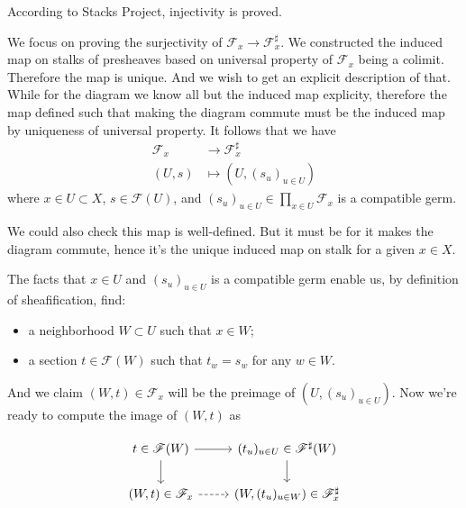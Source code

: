 According to Stacks Project, injectivity is proved. 

We focus on proving the surjectivity of $\mathscr F_x\to \mathscr F^{\sharp}_x$. We constructed the induced map on stalks of presheaves based on universal property of $\mathscr F_x$ being a colimit. Therefore the map is unique. And we wish to get an explicit description of that. While for the diagram we know all but the induced map explicity, therefore the map defined such that making the diagram commute must be the induced map by uniqueness of universal property. It follows that we have 
\begin{align*}
    \mathscr F_x &\to \mathscr F^{\sharp}_x \\
    (U,s) &\mapsto (U, (s_u)_{u\in U})
\end{align*} where $x\in U\subset X$, $s\in \mathscr F(U)$, and $(s_u)_{u\in U}\in \prod_{x\in U} \mathscr F_x$ is a compatible germ. 

We could also check this map is well-defined. But it must be for it makes the diagram commute, hence it's the unique induced map on stalk for a given $x\in X$.

The facts that $x\in U$ and $(s_u)_{u\in U}$ is a compatible germ enable us, by definition of sheafification, find: \begin{itemize}
    \item a neighborhood $W\subset U$ such that $x\in W$;
    \item a section $t\in\mathscr F(W)$ such that 
    $t_w=s_w$ for any $w\in W$.
\end{itemize}

And we claim $(W,t)\in \mathscr F_x$ will be the preimage of $(U,(s_u)_{u\in U})$. Now we're ready to compute the image of $(W,t)$ as 


\[\begin{tikzcd}
	{t\in\mathscr F(W)} & {(t_u)_{u\in U}\in \mathscr F^{\sharp}(W)} \\
	{(W,t)\in\mathscr F_x} & {(W,(t_u)_{u\in W})\in \mathscr F^{\sharp}_x}
	\arrow[from=1-1, to=1-2]
	\arrow[from=1-1, to=2-1]
	\arrow[from=1-2, to=2-2]
	\arrow[dashed, from=2-1, to=2-2]
\end{tikzcd}\]

